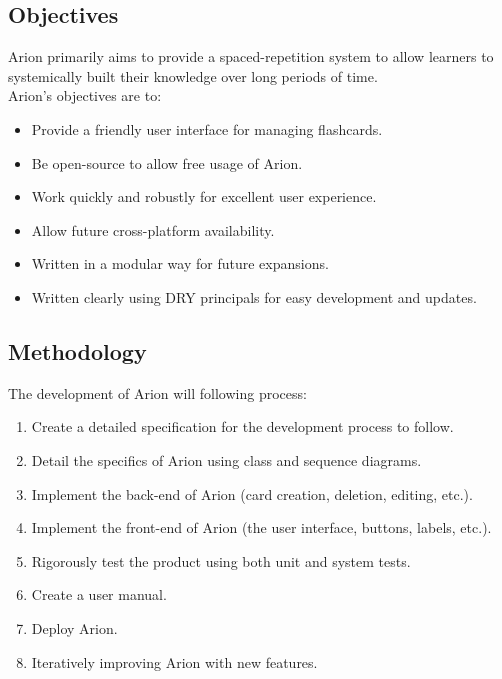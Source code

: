 \documentclass{scrreprt}
\begin{document}
\subsection{Objectives}
Arion primarily aims to provide a spaced-repetition system to allow learners to 
systemically built their knowledge over long periods of time. \\
Arion's objectives are to:
\begin{itemize}
    \item Provide a friendly user interface for managing flashcards.
    \item Be open-source to allow free usage of Arion.
    \item Work quickly and robustly for excellent user experience.
    \item Allow future cross-platform availability.
    \item Written in a modular way for future expansions.
    \item Written clearly using DRY principals for easy development and updates.
\end{itemize}

\subsection{Methodology}
The development of Arion will following process:
\begin{enumerate}[1.]
    \item Create a detailed specification for the development process to follow.
    \item Detail the specifics of Arion using class and sequence diagrams.
    \item Implement the back-end of Arion (card creation, deletion, editing, etc.).
    \item Implement the front-end of Arion (the user interface, buttons, labels, etc.).
    \item Rigorously test the product using both unit and system tests.
    \item Create a user manual.
    \item Deploy Arion.
    \item Iteratively improving Arion with new features.
\end{enumerate}
\end{document}
